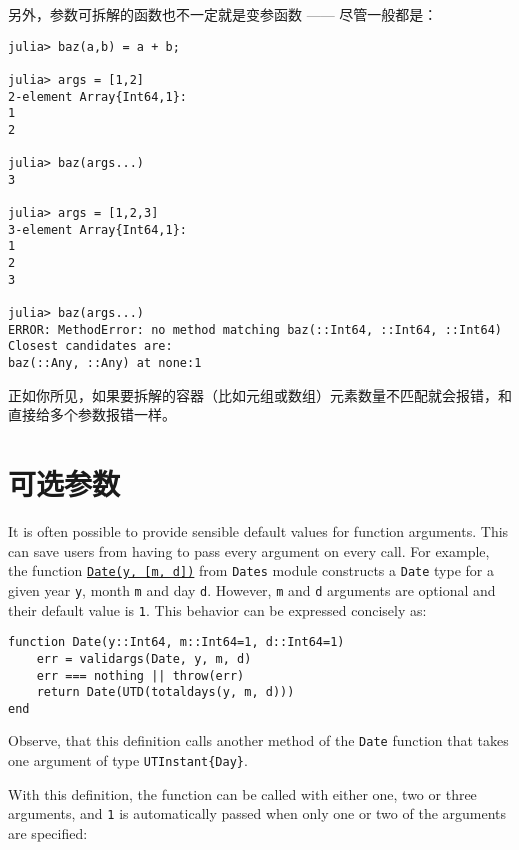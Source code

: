 另外，参数可拆解的函数也不一定就是变参函数 —— 尽管一般都是：




\begin{verbatim}
julia> baz(a,b) = a + b;

julia> args = [1,2]
2-element Array{Int64,1}:
1
2

julia> baz(args...)
3

julia> args = [1,2,3]
3-element Array{Int64,1}:
1
2
3

julia> baz(args...)
ERROR: MethodError: no method matching baz(::Int64, ::Int64, ::Int64)
Closest candidates are:
baz(::Any, ::Any) at none:1
\end{verbatim}



正如你所见，如果要拆解的容器（比如元组或数组）元素数量不匹配就会报错，和直接给多个参数报错一样。



\hypertarget{16207703858977287144}{}


\section{可选参数}



It is often possible to provide sensible default values for function arguments. This can save users from having to pass every argument on every call. For example, the function \hyperlink{4488183467971164548}{\texttt{Date(y, [m, d])}} from \texttt{Dates} module constructs a \texttt{Date} type for a given year \texttt{y}, month \texttt{m} and day \texttt{d}. However, \texttt{m} and \texttt{d} arguments are optional and their default value is \texttt{1}. This behavior can be expressed concisely as:




\begin{verbatim}
function Date(y::Int64, m::Int64=1, d::Int64=1)
    err = validargs(Date, y, m, d)
    err === nothing || throw(err)
    return Date(UTD(totaldays(y, m, d)))
end
\end{verbatim}



Observe, that this definition calls another method of the \texttt{Date} function that takes one argument of type \texttt{UTInstant\{Day\}}.



With this definition, the function can be called with either one, two or three arguments, and \texttt{1} is automatically passed when only one or two of the arguments are specified:




